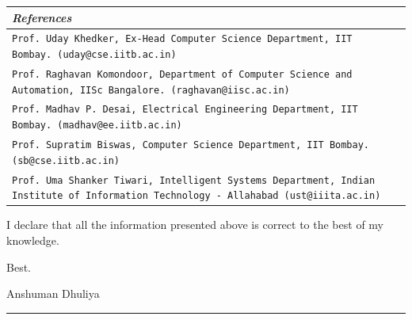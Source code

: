 \documentclass[a4paper,12pt]{article}
\newcommand{\Heading}[1]{\textbf{\itshape\normalsize #1}}
\begin{document}
\begin{flushleft}

\vspace{3mm}
\begin{tabular}{ m{} M{0.05\textwidth}}
    \multicolumn{2}{l}{\Heading{References}} \\
    \hline
    \hline
    \rule[13pt]{0ex}{0ex}\texttt{Prof. Uday Khedker, Ex-Head Computer Science Department, IIT Bombay. (uday@cse.iitb.ac.in)} & \\ \hline

    \rule[13pt]{0ex}{0ex}\texttt{Prof. Raghavan Komondoor, Department of Computer Science and Automation, IISc Bangalore. (raghavan@iisc.ac.in)} & \\ \hline

    \rule[13pt]{0ex}{0ex}\texttt{Prof. Madhav P. Desai, Electrical Engineering Department, IIT Bombay. (madhav@ee.iitb.ac.in)} & \\ \hline


    \rule[13pt]{0ex}{0ex}\texttt{Prof. Supratim Biswas, Computer Science Department, IIT Bombay. (sb@cse.iitb.ac.in)} & \\ \hline

    \rule[13pt]{0ex}{0ex}\texttt{Prof. Uma Shanker Tiwari, Intelligent Systems Department,
    Indian Institute of Information Technology - Allahabad (ust@iiita.ac.in)} & \\ \hline

\end{tabular}

\vspace{2em}
I declare that all the information presented above is correct
to the best of my knowledge.

\vspace{2em}

Best.

\vspace{2em}
Anshuman Dhuliya


\vspace*{\fill}
\rule[1pt]{\textwidth}{2pt}

\end{flushleft}
\end{document}
